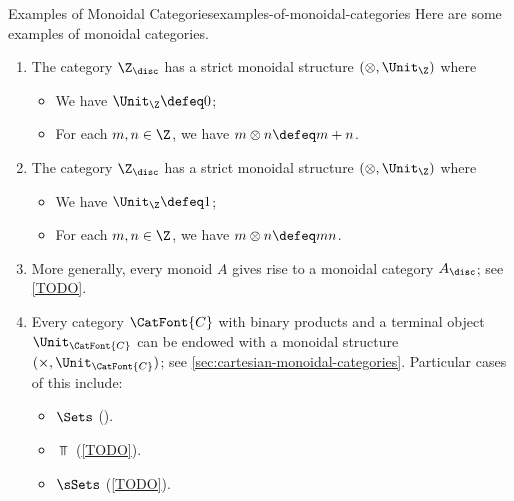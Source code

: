 \begin{example}{Examples of Monoidal Categories}{examples-of-monoidal-categories}%
    Here are some examples of monoidal categories.
    \begin{enumerate}
        \item\label{examples-of-monoidal-categories-the-integers-with-addition}The category $\Z_{\disc}$ has a strict monoidal structure $(\otimes,\Unit_{\Z})$ where
            \begin{itemize}
                \item We have $\Unit_{\Z}\defeq0$;
                \item For each $m,n\in\Z$, we have $m\otimes n\defeq m+n$.
            \end{itemize}
        \item\label{examples-of-monoidal-categories-the-integers-with-multiplication}The category $\Z_{\disc}$ has a strict monoidal structure $(\otimes,\Unit_{\Z})$ where
            \begin{itemize}
                \item We have $\Unit_{\Z}\defeq1$;
                \item For each $m,n\in\Z$, we have $m\otimes n\defeq mn$.
            \end{itemize}
        \item\label{examples-of-monoidal-categories-monoids}More generally, every monoid $A$ gives rise to a monoidal category $A_{\disc}$; see \cref{TODO}.
        \item\label{examples-of-monoidal-categories-cartesian-monoidal-categories}Every category $\CatFont{C}$ with binary products and a terminal object $\Unit_{\CatFont{C}}$ can be endowed with a monoidal structure $(\times,\Unit_{\CatFont{C}})$; see \cref{sec:cartesian-monoidal-categories}. Particular cases of this include:
            \begin{itemize}
                \item $\Sets$     ().
                \item $\Top$      (\cref{TODO}).
                \item $\sSets$    (\cref{TODO}).

\end{itemize}
\end{enumerate}
\end{example}

